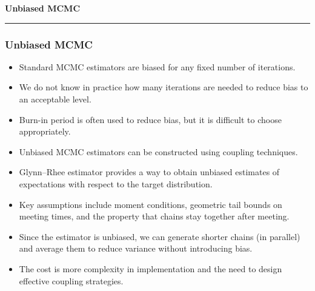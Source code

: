 \documentclass[aspectratio=169]{beamer}
\begin{document}
\begin{frame}
	\vspace{2cm}
	\begin{center}
		{\Huge\textbf{\textcolor{copenhagenred}{Unbiased MCMC}}}
		\vspace{1cm}

		\rule{4cm}{3pt}
		\vspace{2cm}
	\end{center}
\end{frame}

\begin{frame}
	\frametitle{Unbiased MCMC}

	\begin{itemize}
		\item Standard MCMC estimators are biased for any fixed number of iterations.
		\item We do not know in practice how many iterations are needed to reduce bias to an acceptable level.
		\item Burn-in period is often used to reduce bias, but it is difficult to choose appropriately.
		\item Unbiased MCMC estimators can be constructed using coupling techniques.
		\item Glynn--Rhee estimator provides a way to obtain unbiased estimates of expectations with respect to the target distribution.
		\item Key assumptions include moment conditions, geometric tail bounds on meeting times, and the property that chains stay together after meeting.
		\item Since the estimator is unbiased, we can generate shorter chains (in parallel) and average them to reduce variance without introducing bias.
		\item The cost is more complexity in implementation and the need to design effective coupling strategies.
	\end{itemize}
\end{frame}
\end{document}
